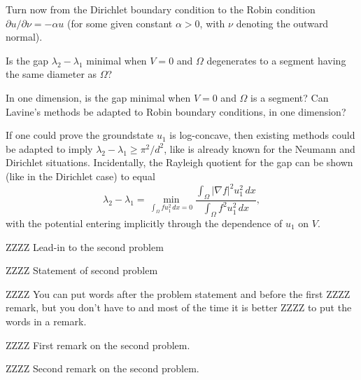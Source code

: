 \documentclass[12pt,letterpaper, reqno]{amsart}
\begin{document}
\begin{problemblock} Turn now from the Dirichlet boundary condition to the Robin
condition $\partial u / \partial \nu = -\alpha u$ (for some given
constant $\alpha > 0$, with $\nu$ denoting the outward normal).

\begin{problem}
Is
the gap $\lambda_2 - \lambda_1$ minimal when $V=0$ and $\Omega$
degenerates to a segment having the same diameter as $\Omega$?

In one dimension, is the gap minimal when $V=0$ and $\Omega$ is a
segment? Can Lavine's methods be adapted to Robin boundary
conditions, in one dimension?
\end{problem}

If one could prove the groundstate $u_1$ is log-concave, then
existing methods could be adapted to imply $\lambda_2 - \lambda_1
\geq \pi^2/d^2$, like is already known for the Neumann and Dirichlet
situations. Incidentally, the Rayleigh quotient for the gap can be
shown (like in the Dirichlet case) to equal
\[
\lambda_2 - \lambda_1 = \min_{\int_\Omega f u_1^2 \, dx = 0}
\frac{\int_\Omega |\nabla f|^2 u_1^2 \, dx}{\int_\Omega f^2 u_1^2 \,
dx} ,
\]
with the potential entering implicitly through the dependence of
$u_1$ on $V$.

\end{problemblock}

\begin{problemblock}

ZZZZ Lead-in to the second problem

\begin{problem}
ZZZZ Statement of second problem
\end{problem}

ZZZZ You can put words after the problem statement and before the first
ZZZZ remark, but you don't have to and most of the time it is better
ZZZZ to put the words in a remark.

\begin{remark}
ZZZZ First remark on the second problem.
\end{remark}

\begin{remark}
ZZZZ Second remark on the second problem.
\end{remark}

\end{problemblock}
\end{document}

